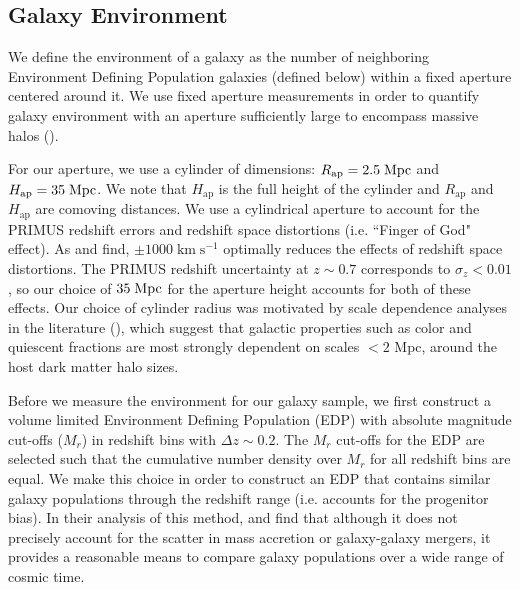 \subsection{Galaxy Environment} \label{sec:environment}
We define the environment of a galaxy as the number of neighboring Environment Defining Population galaxies (defined below) within a fixed aperture centered around it. We use fixed aperture measurements in order to quantify galaxy environment with an aperture sufficiently large to encompass massive halos (\citealt{Muldrew:2012aa, Skibba:2013aa}).

For our aperture, we use a cylinder of dimensions: $R_{\mathrm{ap}} = 2.5\;
\mathrm{Mpc}$ and $H_{\mathrm{ap}} = 35\; \mathrm{Mpc}$. We note that $H_\mathrm{ap}$ is the full height of the cylinder and $R_\mathrm{ap}$ 
and $H_\mathrm{ap}$ are comoving distances. We use a
cylindrical aperture to account for the PRIMUS redshift
errors and redshift space distortions (i.e. ``Finger of God"
effect). As \cite{Cooper:2005aa} and \cite{Gallazzi:2009aa} find, 
$\pm 1000 \; \mathrm{km} \;\mathrm{s^{-1}}$ optimally reduces the effects of redshift space
distortions. The PRIMUS redshift uncertainty at $z \sim 0.7$
corresponds to $\sigma_z < 0.01$, so our choice of $35\;
\mathrm{Mpc}$ for the aperture height accounts for both of these effects. Our choice of
cylinder radius was motivated by scale dependence analyses in the
literature (\citealt{Blanton:2006ab, Wilman:2010aa, Muldrew:2012aa}),
which suggest that galactic properties such as color and quiescent
fractions are most strongly dependent on scales $< 2$ Mpc, around the
host dark matter halo sizes.


Before we measure the environment for our galaxy sample, we first
construct a volume limited Environment Defining Population (EDP) with
absolute magnitude cut-offs ($M_{r}$) in redshift bins with $\Delta z
\sim 0.2$. The $M_{r}$ cut-offs for the EDP are selected such that the
cumulative number density over $M_{r}$ for all redshift bins are
equal.  We make this choice in order to construct an EDP that contains
similar galaxy populations through the redshift range (i.e. accounts
for the progenitor bias). In their analysis of this method,
\cite{Behroozi:2013aa} and \cite{Leja:2013aa} find that although it
does not precisely account for the scatter in mass accretion or
galaxy-galaxy mergers, it provides a reasonable means to compare
galaxy populations over a wide range of cosmic time.

